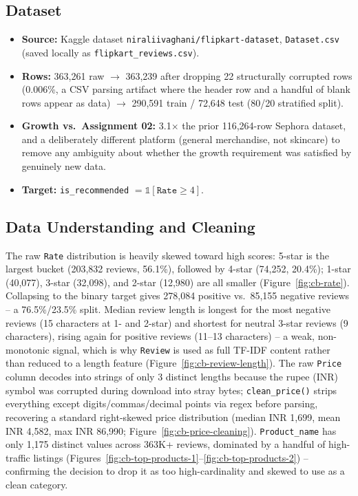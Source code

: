 \documentclass[11pt, a4paper]{article}
\begin{document}
\subsection{Dataset}
\begin{itemize}
    \item \textbf{Source:} Kaggle dataset \texttt{niraliivaghani/flipkart-dataset},
    \texttt{Dataset.csv} (saved locally as \texttt{flipkart\_reviews.csv}).
    \item \textbf{Rows:} 363,261 raw $\to$ 363,239 after dropping 22 structurally corrupted
    rows (0.006\%, a CSV parsing artifact where the header row and a handful of blank rows
    appear as data) $\to$ 290,591 train / 72,648 test (80/20 stratified split).
    \item \textbf{Growth vs.\ Assignment 02:} 3.1$\times$ the prior 116,264-row Sephora
    dataset, and a deliberately different platform (general merchandise, not skincare) to
    remove any ambiguity about whether the growth requirement was satisfied by genuinely
    new data.
    \item \textbf{Target:} \texttt{is\_recommended} $= \mathbb{1}[\texttt{Rate} \geq 4]$.
\end{itemize}

\subsection{Data Understanding and Cleaning}
The raw \texttt{Rate} distribution is heavily skewed toward high scores: 5-star is the
largest bucket (203,832 reviews, 56.1\%), followed by 4-star (74,252, 20.4\%); 1-star
(40,077), 3-star (32,098), and 2-star (12,980) are all smaller
(Figure~\ref{fig:cb-rate}). Collapsing to the binary target gives 278,084 positive vs.\
85,155 negative reviews -- a 76.5\%/23.5\% split. Median review length is longest for the
most negative reviews (15 characters at 1- and 2-star) and shortest for neutral 3-star
reviews (9 characters), rising again for positive reviews (11--13 characters) -- a weak,
non-monotonic signal, which is why \texttt{Review} is used as full TF-IDF content rather
than reduced to a length feature (Figure~\ref{fig:cb-review-length}). The raw \texttt{Price}
column decodes into strings of only 3 distinct lengths because the rupee (INR) symbol was
corrupted during download into stray bytes; \texttt{clean\_price()} strips everything
except digits/commas/decimal points via regex before parsing, recovering a standard
right-skewed price distribution (median INR 1,699, mean INR 4,582, max INR 86,990;
Figure~\ref{fig:cb-price-cleaning}). \texttt{Product\_name} has only 1,175 distinct values
across 363K+ reviews, dominated by a handful of high-traffic listings
(Figures~\ref{fig:cb-top-products-1}--\ref{fig:cb-top-products-2}) -- confirming the
decision to drop it as too high-cardinality and skewed to use as a clean category.
\end{document}
